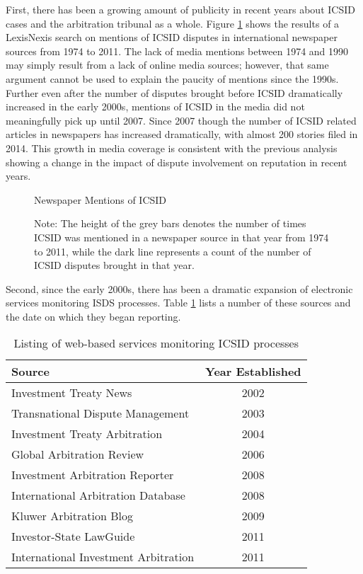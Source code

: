 \documentclass[12pt,onesided]{amsart}
\begin{document}
First, there has been a growing amount of publicity in recent years about ICSID cases and the arbitration tribunal as a whole. Figure \ref{fig:icsidMedia} shows the results of a LexisNexis search on mentions of ICSID disputes in international newspaper sources from 1974 to 2011. The lack of media mentions between 1974 and 1990 may simply result from a lack of online media sources; however, that same argument cannot be used to explain the paucity of mentions since the 1990s. Further even after the number of disputes brought before ICSID dramatically increased in the early 2000s, mentions of ICSID in the media did not meaningfully pick up until 2007. Since 2007 though the number of ICSID related articles in newspapers has increased dramatically, with almost 200 stories filed in 2014. This growth in media coverage is consistent with the previous analysis showing a change in the impact of dispute involvement on reputation in recent years.

\begin{figure}[ht]
	\vspace{4cm}
	\centering
	\caption{Newspaper Mentions of ICSID}
	\label{fig:icsidMedia}
	\resizebox{1\textwidth}{!}{}
	\caption*{Note: The height of the grey bars denotes the number of times ICSID was mentioned in a newspaper source in that year from 1974 to 2011, while the dark line represents a count of the number of ICSID disputes brought in that year.}
\end{figure}
\FloatBarrier

Second, since the early 2000s, there has been a dramatic expansion of electronic services monitoring ISDS processes. Table \ref{tab:disputeSites} lists a number of these sources and the date on which they began reporting. 

\begin{table}[ht]
\centering
\caption{Listing of web-based services monitoring ICSID processes}
\label{tab:disputeSites}
\begin{tabular}{lc}
	\hline\hline
	Source & Year Established \\
	\hline
	Investment Treaty News & 2002 \\
	Transnational Dispute Management & 2003 \\
	Investment Treaty Arbitration & 2004 \\
	Global Arbitration Review & 2006 \\
	Investment Arbitration Reporter & 2008 \\
	International Arbitration Database & 2008 \\
	Kluwer Arbitration Blog & 2009 \\
	Investor-State LawGuide & 2011 \\
	International Investment Arbitration & 2011 \\
	\hline\hline
\end{tabular}
\end{table}
\FloatBarrier
\end{document}
